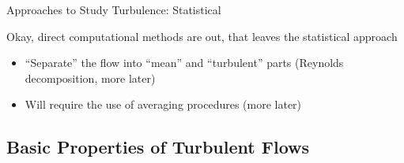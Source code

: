 
\begin{frame}{Approaches to Study Turbulence: Statistical}

Okay, direct computational methods are out, that leaves the statistical approach

\begin{itemize}
	\item ``Separate'' the flow into ``mean'' and ``turbulent'' parts (Reynolds decomposition, more later)
	\item Will require the use of averaging procedures (more later)
\end{itemize}
\end{frame}

\subsection{Basic Properties of Turbulent Flows}

